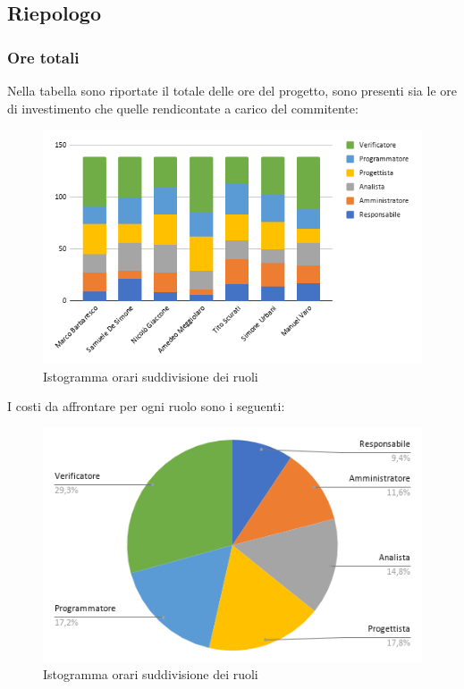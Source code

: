 \subsection{Riepologo}
    \subsubsection{Ore totali}
        Nella tabella sono riportate il totale delle ore del progetto, sono presenti sia le ore di investimento che quelle rendicontate a carico del commitente:
        \begin{figure}[!h]
            \caption{Istogramma orari suddivisione dei ruoli}
            \vspace{5px}
            \includegraphics[scale=0.6]{../../../Images/Diagrammi/Istogrammi/ore totali.png}
            \centering
        \end{figure}

        I costi da affrontare per ogni ruolo sono i seguenti:
        \begin{figure}[!h]
            \caption{Istogramma orari suddivisione dei ruoli}
            \vspace{5px}
            \includegraphics[scale=0.5]{../../../Images/Diagrammi/Diagramma a torta/ore totali.png}
            \centering
        \end{figure}
